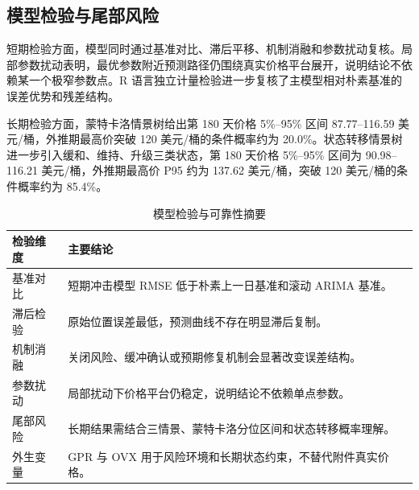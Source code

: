 \subsection{模型检验与尾部风险}

短期检验方面，模型同时通过基准对比、滞后平移、机制消融和参数扰动复核。局部参数扰动表明，最优参数附近预测路径仍围绕真实价格平台展开，说明结论不依赖某一个极窄参数点。R 语言独立计量检验进一步复核了主模型相对朴素基准的误差优势和残差结构。

长期检验方面，蒙特卡洛情景树给出第 180 天价格 5\%--95\% 区间 87.77--116.59 美元/桶，外推期最高价突破 120 美元/桶的条件概率约为 20.0\%。状态转移情景树进一步引入缓和、维持、升级三类状态，第 180 天价格 5\%--95\% 区间为 90.98--116.21 美元/桶，外推期最高价 P95 约为 137.62 美元/桶，突破 120 美元/桶的条件概率约为 85.4\%。

\begin{table}[!htbp]
\centering
\caption{模型检验与可靠性摘要}
\begin{tabularx}{\linewidth}{lX}
\toprule
检验维度 & 主要结论 \\
\midrule
基准对比 & 短期冲击模型 RMSE 低于朴素上一日基准和滚动 ARIMA 基准。 \\
滞后检验 & 原始位置误差最低，预测曲线不存在明显滞后复制。 \\
机制消融 & 关闭风险、缓冲确认或预期修复机制会显著改变误差结构。 \\
参数扰动 & 局部扰动下价格平台仍稳定，说明结论不依赖单点参数。 \\
尾部风险 & 长期结果需结合三情景、蒙特卡洛分位区间和状态转移概率理解。 \\
外生变量 & GPR 与 OVX 用于风险环境和长期状态约束，不替代附件真实价格。 \\
\bottomrule
\end{tabularx}
\end{table}

